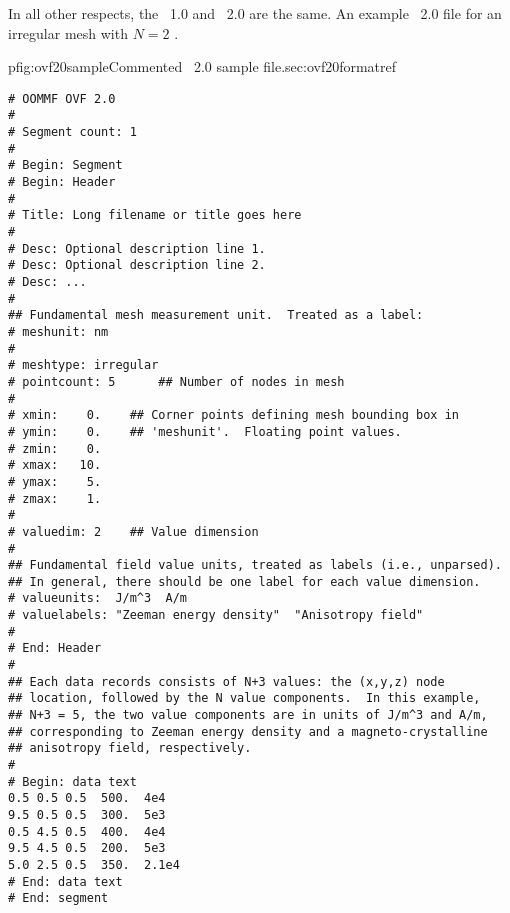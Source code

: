 In all other respects, the \OVF~1.0 and \OVF~2.0 are the same.  An
example \OVF~2.0 file for an irregular mesh with $N=2$
.

\begin{codelisting}{p}{fig:ovf20sample}{Commented \OVF~2.0 sample
  file.}{sec:ovf20format}{ref}
\begin{verbatim}
# OOMMF OVF 2.0
#
# Segment count: 1
#
# Begin: Segment
# Begin: Header
#
# Title: Long filename or title goes here
#
# Desc: Optional description line 1.
# Desc: Optional description line 2.
# Desc: ...
#
## Fundamental mesh measurement unit.  Treated as a label:
# meshunit: nm
#
# meshtype: irregular
# pointcount: 5      ## Number of nodes in mesh
#
# xmin:    0.    ## Corner points defining mesh bounding box in
# ymin:    0.    ## 'meshunit'.  Floating point values.
# zmin:    0.
# xmax:   10.
# ymax:    5.
# zmax:    1.
#
# valuedim: 2    ## Value dimension
#
## Fundamental field value units, treated as labels (i.e., unparsed).
## In general, there should be one label for each value dimension.
# valueunits:  J/m^3  A/m
# valuelabels: "Zeeman energy density"  "Anisotropy field"
#
# End: Header
#
## Each data records consists of N+3 values: the (x,y,z) node
## location, followed by the N value components.  In this example,
## N+3 = 5, the two value components are in units of J/m^3 and A/m,
## corresponding to Zeeman energy density and a magneto-crystalline
## anisotropy field, respectively.
#
# Begin: data text
0.5 0.5 0.5  500.  4e4
9.5 0.5 0.5  300.  5e3
0.5 4.5 0.5  400.  4e4
9.5 4.5 0.5  200.  5e3
5.0 2.5 0.5  350.  2.1e4
# End: data text
# End: segment
\end{verbatim}
\end{codelisting}


